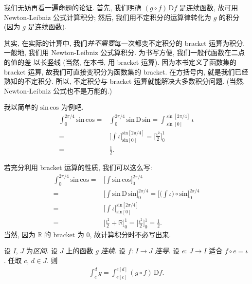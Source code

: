 我们无妨再看一遍命题的论证.
首先, 我们明确 $(g \circ f)\,\mathrm{D}f$ 是连续函数,
故可用 Newton-Leibniz 公式计算积分;
然后, 我们用不定积分的运算律转化为 $g$ 的积分
(因为 $g$ 是连续函数).

其实, 在实际的计算中,
我们\emph{并不需要}每一次都变不定积分的 bracket 运算为积分.
一般地, 我们用 Newton-Leibniz 公式算积分.
为书写方便, 我们一般代函数在二点的值的差
以长竖线 (当然, 在本书, 用 bracket 运算).
因为本书定义了函数集的 bracket 运算,
故我们可直接变积分为函数集的 bracket.
在方括号内, 就是我们已经熟知的不定积分.
所以, 不定积分与 bracket 运算就能解决大多数积分问题.
(当然, Newton-Leibniz 公式也不是万能的.)

\begin{example}
    我以简单的 $\mathrm{sin}\, \mathrm{cos}$ 为例吧.
    \begin{align*}
        \int_{0}^{2\pi/4} {\mathrm{sin}\,\mathrm{cos}}
        = {} & \int_{0}^{2\pi/4} {\mathrm{sin}\,\mathrm{D}\,\mathrm{sin}}
        = \int_{\sin[0]}^{\sin[2\pi/4]} {\iota}                                    \\
        = {} & \Bigg[ \int {\iota} \Bigg]_{\mathrm{sin}[0]}^{\mathrm{sin}[2\pi/4]}
        = \Bigg[ \frac{\iota^2}{2} \Bigg]_{0}^{1}                                  \\
        = {} & \frac{1}{2}.
    \end{align*}

    若充分利用 bracket 运算的性质, 我们可以这么写:
    \begin{align*}
        \int_{0}^{2\pi/4} {\mathrm{sin}\,\mathrm{cos}}
        = {} & \Bigg[ \int {\mathrm{sin}\,\mathrm{cos}} \Bigg]_{0}^{2\pi/4}             \\
        = {} & \Bigg[ \int {\mathrm{sin}\,\mathrm{D}\,\mathrm{sin}} \Bigg]_{0}^{2\pi/4}
        = \Bigg[ \Bigg( \int {\iota} \Bigg) \circ \mathrm{sin} \Bigg]_{0}^{2\pi/4}      \\
        = {} & \Bigg[ \int {\iota} \Bigg]_{\mathrm{sin}[0]}^{\mathrm{sin}[2\pi/4]}      \\
        = {} & \Bigg[ \frac{\iota^2}{2} + \mathbb{R} \Bigg]_{0}^{1}
        = \Bigg[ \frac{\iota^2}{2} \Bigg]_{0}^{1}
        = \frac{1}{2}.
    \end{align*}
    当然, 因为 $\mathbb{R}$ 的 bracket 为 $0$,
    故计算积分时不必写出来.
\end{example}

\begin{theorem}
    设 $I$, $J$ 为\emph{区间}.
    设 $J$ 上的函数 $g$ \emph{连续}.
    设 $f$: $I \to J$ \emph{连导}.
    设 $e$: $J \to I$ 适合 $f \circ e = \iota$.
    任取 $c$, $d \in J$.
    则
    \begin{align*}
        \int_{c}^{d} {g} = \int_{e[c]}^{e[d]} {(g \circ f)\,\mathrm{D}f}.
    \end{align*}
\end{theorem}

